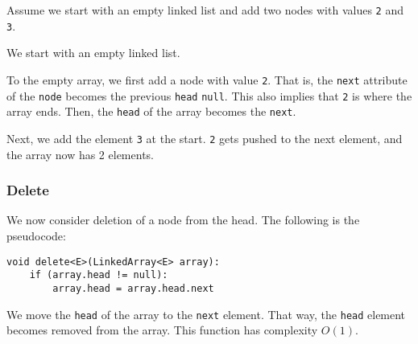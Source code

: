 \documentclass[a4paper, openany]{memoir}
\begin{document}
\noindent Assume we start with an empty linked list and add two nodes with values \texttt{2} and \texttt{3}.
\begin{center}
\end{center}
We start with an empty linked list.
\begin{center}
\end{center}
To the empty array, we first add a node with value \texttt{2}. That is, the \texttt{next} attribute of the \texttt{node} becomes the previous \texttt{head} \texttt{null}. This also implies that \texttt{2} is where the array ends. Then, the \texttt{head} of the array becomes the \texttt{next}.
\begin{center}
\end{center}
Next, we add the element \texttt{3} at the start. \texttt{2} gets pushed to the next element, and the array now has 2 elements.

\subsubsection{Delete}
\noindent We now consider deletion of a node from the head. The following is the pseudocode:
\begin{lstlisting}[language=pseudocode]
void delete<E>(LinkedArray<E> array):
    if (array.head != null):
        array.head = array.head.next
\end{lstlisting}
We move the \texttt{head} of the array to the \texttt{next} element. That way, the \texttt{head} element becomes removed from the array. This function has complexity $O(1)$.
\end{document}
